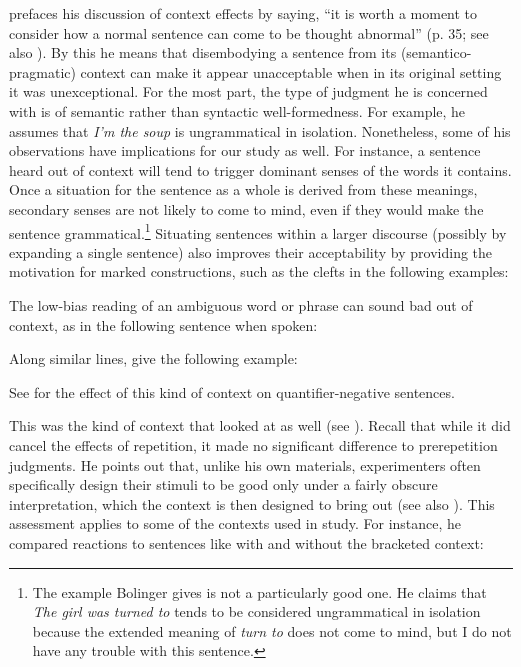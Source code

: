 \citet{Bolinger1968} prefaces his discussion of context effects by saying, ``it is worth a moment to consider how a normal sentence can come to be thought abnormal'' (p. 35; see also \citet{Bolinger1971}). By this he means that disembodying a sentence from its (semantico-pragmatic) context can make it appear unacceptable when in its original setting it was unexceptional. For the most part, the type of judgment he is concerned with is of semantic rather than syntactic well-formedness. For example, he assumes that \textit{I'm the soup} is ungrammatical in isolation. Nonetheless, some of his observations have implications for our study as well. For instance, a sentence heard out of context will tend to trigger dominant senses of the words it contains. Once a situation for the sentence as a whole is derived from these meanings, secondary senses are not likely to come to mind, even if they would make the sentence grammatical.\footnote{The example Bolinger gives is not a particularly good one. He claims that \textit{The girl was turned to} tends to be considered ungrammatical in isolation because the extended meaning of \textit{turn to} does not come to mind, but I do not have any trouble with this sentence.
}
 Situating sentences within a larger discourse (possibly by expanding a single sentence) also improves their acceptability by providing the motivation for marked constructions, such as the clefts in the following examples:

\z

\z


\noindent
The low-bias reading of an ambiguous word or phrase can sound bad out of context, as in the following sentence when spoken:

\z

\noindent
Along similar lines, \citet{BeverEtAl1976a} give the following example:
\ea
{}
\z
\z

\noindent
See  for the effect of this kind of context on quantifier-negative sentences.

This was the kind of context that \citet{Nagata1988} looked at as well (see ). Recall that while it did cancel the effects of repetition, it made no significant difference to prerepetition judgments. He points out that, unlike his own materials, experimenters often specifically design their stimuli to be good only under a fairly obscure interpretation, which the context is then designed to bring out (see also \citet{GleitmanEtAl1970}). This assessment applies to some of the contexts used in  study. For instance, he compared reactions to sentences like  with and without the bracketed context:

